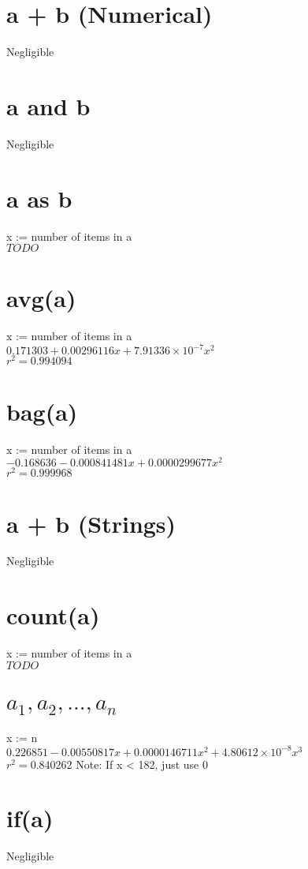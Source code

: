 \documentclass[12pt]{article}
\begin{document}
	\section{a + b (Numerical)}
	Negligible
	
	\section{a and b}
	Negligible
	
	\section{a as b}
	x := number of items in a\\
	$TODO$
	
	\section{avg(a)}
	x := number of items in a\\
	$0.171303 + 0.00296116x + 7.91336 \times 10^{-7} x^2$\\
	$r^2 = 0.994094$

	\section{bag(a)}
	x := number of items in a\\
	$-0.168636 - 0.000841481x + 0.0000299677x^2$\\
	$r^2 = 0.999968$
	
	\section{a + b (Strings)}
	Negligible
	
	\section{count(a)}
	x := number of items in a\\
	$TODO$
	
	\section{$a_1, a_2, ..., a_n$}
	x := n\\
	$0.226851 - 0.00550817x + 0.0000146711x^2 + 4.80612 \times 10^{-8} x^3$\\
	$r^2 = 0.840262$
	Note: If x < 182, just use 0
	
	\section{if(a)}
	Negligible
	
\end{document}
